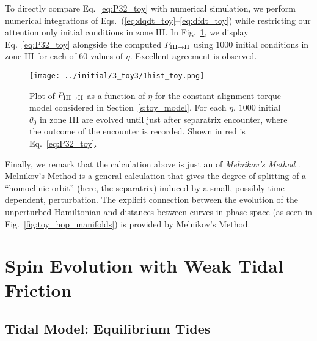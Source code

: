 \documentclass[
        fleqn,
        usenatbib,
    ]{mnras}
\begin{document}
To directly compare Eq.~\eqref{eq:P32_toy} with numerical simulation, we perform
numerical integrations of Eqs.~(\ref{eq:dqdt_toy}--\ref{eq:dfdt_toy}) while
restricting our attention only initial conditions in zone III\@.
In Fig.~\ref{fig:1hist_toy}, we display Eq.~\eqref{eq:P32_toy} alongside the
computed $P_{\rm III \to II}$ using $1000$ initial conditions in zone III for
each of $60$ values of $\eta$. Excellent agreement is observed.
\begin{figure}
    \centering
    \texttt{[image: ../initial/3\_toy3/1hist\_toy.png]}
    \caption{Plot of $P_{\rm III \to II}$ as a function of $\eta$ for the
    constant alignment torque model considered in Section~\ref{s:toy_model}. For
    each $\eta$, $1000$ initial $\theta_0$ in zone III are evolved until just
    after separatrix encounter, where the outcome of the encounter is recorded.
    Shown in red is Eq.~\eqref{eq:P32_toy}.}\label{fig:1hist_toy}
\end{figure}

Finally, we remark that the calculation above is just an of \emph{Melnikov's
Method} \citep{g_and_h}. Melnikov's Method is a general calculation that gives
the degree of splitting of a ``homoclinic orbit'' (here, the separatrix) induced
by a small, possibly time-dependent, perturbation. The explicit connection
between the evolution of the unperturbed Hamiltonian and distances between
curves in phase space (as seen in Fig.~\ref{fig:toy_hop_manifolds}) is provided by
Melnikov's Method.

\section{Spin Evolution with Weak Tidal Friction}\label{s:full_tide_prob}

\subsection{Tidal Model: Equilibrium Tides}\label{ss:weaktide}
\end{document}
